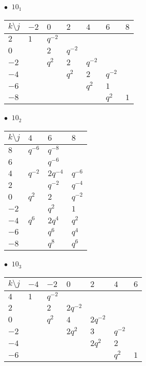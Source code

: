 \begin{minipage}{\linewidth}
$\bullet\ $ $10_{1}$ \vspace{0.5em} \\
\begin{tabular}{l|llllll}
$k \setminus j$ & $-2$ & $0$ & $2$ & $4$ & $6$ & $8$ \\
\hline
$2$ & $1$ & $q^{-2}$ &  &  &  &  \\
$0$ &  & $2$ & $q^{-2}$ &  &  &  \\
$-2$ &  & $q^{2}$ & $2$ & $q^{-2}$ &  &  \\
$-4$ &  &  & $q^{2}$ & $2$ & $q^{-2}$ &  \\
$-6$ &  &  &  & $q^{2}$ & $1$ &  \\
$-8$ &  &  &  &  & $q^{2}$ & $1$ \\
\end{tabular}
\vspace{2em}
\end{minipage}
%
\begin{minipage}{\linewidth}
$\bullet\ $ $10_{2}$ \vspace{0.5em} \\
\begin{tabular}{l|lll}
$k \setminus j$ & $4$ & $6$ & $8$ \\
\hline
$8$ & $q^{-6}$ & $q^{-8}$ &  \\
$6$ &  & $q^{-6}$ &  \\
$4$ & $q^{-2}$ & $2q^{-4}$ & $q^{-6}$ \\
$2$ &  & $q^{-2}$ & $q^{-4}$ \\
$0$ & $q^{2}$ & $2$ & $q^{-2}$ \\
$-2$ &  & $q^{2}$ & $1$ \\
$-4$ & $q^{6}$ & $2q^{4}$ & $q^{2}$ \\
$-6$ &  & $q^{6}$ & $q^{4}$ \\
$-8$ &  & $q^{8}$ & $q^{6}$ \\
\end{tabular}
\vspace{2em}
\end{minipage}
%
\begin{minipage}{\linewidth}
$\bullet\ $ $10_{3}$ \vspace{0.5em} \\
\begin{tabular}{l|llllll}
$k \setminus j$ & $-4$ & $-2$ & $0$ & $2$ & $4$ & $6$ \\
\hline
$4$ & $1$ & $q^{-2}$ &  &  &  &  \\
$2$ &  & $2$ & $2q^{-2}$ &  &  &  \\
$0$ &  & $q^{2}$ & $4$ & $2q^{-2}$ &  &  \\
$-2$ &  &  & $2q^{2}$ & $3$ & $q^{-2}$ &  \\
$-4$ &  &  &  & $2q^{2}$ & $2$ &  \\
$-6$ &  &  &  &  & $q^{2}$ & $1$ \\
\end{tabular}
\vspace{2em}
\end{minipage}
